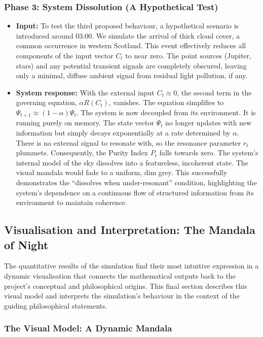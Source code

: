 \documentclass{article}
\begin{document}
\subsubsection{Phase 3: System Dissolution (A Hypothetical Test)}

\begin{itemize}
    \item \textbf{Input:} To test the third proposed behaviour, a hypothetical scenario is introduced around 03:00. We simulate the arrival of thick cloud cover, a common occurrence in western Scotland. This event effectively reduces all components of the input vector $C_t$ to near zero. The point sources (Jupiter, stars) and any potential transient signals are completely obscured, leaving only a minimal, diffuse ambient signal from residual light pollution, if any.
    \item \textbf{System response:} With the external input $C_t \approx 0$, the second term in the governing equation, $\alpha R(C_t)$, vanishes. The equation simplifies to $\Psi_{t+1} \approx (1-\alpha)\Psi_t$. The system is now decoupled from its environment. It is running purely on memory. The state vector $\Psi_t$ no longer updates with new information but simply decays exponentially at a rate determined by $\alpha$. There is no external signal to resonate with, so the resonance parameter $r_t$ plummets. Consequently, the Purity Index $P_t$ falls towards zero. The system's internal model of the sky dissolves into a featureless, incoherent state. The visual mandala would fade to a uniform, dim grey. This successfully demonstrates the ``dissolves when under-resonant'' condition, highlighting the system's dependence on a continuous flow of structured information from its environment to maintain coherence.
\end{itemize}

\subsection{Visualisation and Interpretation: The Mandala of Night}

The quantitative results of the simulation find their most intuitive expression in a dynamic visualisation that connects the mathematical outputs back to the project's conceptual and philosophical origins. This final section describes this visual model and interprets the simulation's behaviour in the context of the guiding philosophical statements.

\subsubsection{The Visual Model: A Dynamic Mandala}
\end{document}
